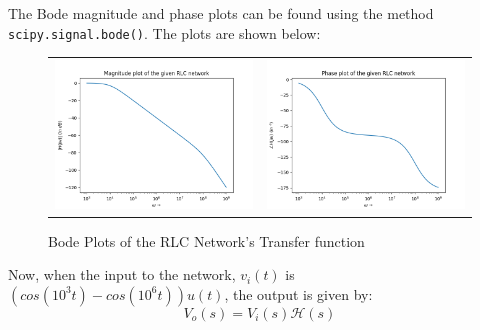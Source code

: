 \documentclass[11pt, a4paper, twoside]{article}
\begin{document}
    The Bode magnitude and phase plots can be found using the method \texttt{scipy.signal.bode()}. The plots are shown below:
    \begin{figure}[H]
        \centering
        \setlength\tabcolsep{2pt}
        \begin{tabular}{cc}
            \includegraphics[scale=0.5]{Fig 5(a).png} &
            \includegraphics[scale=0.5]{Fig 5(b).png}\\
        \end{tabular}
        \caption{Bode Plots of the RLC Network's Transfer function}
    \end{figure}
    
    Now, when the input to the network, $v_i(t)$ is $(cos(10^3t)-cos(10^6t))u(t)$, the output is given by:
    \begin{equation*}
        V_o(s) = V_i(s)\mathcal{H}(s)
    \end{equation*}
    
\end{document}
